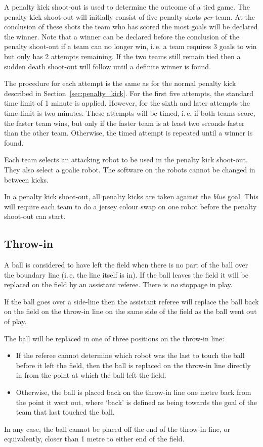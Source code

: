\documentclass[12pt]{article}
\newcommand{\ie}{\mbox{i.\,e.}\xspace}
\begin{document}
A penalty kick shoot-out is used to determine the outcome of a tied
game. The penalty kick shoot-out will initially consist of five
penalty shots \emph{per} team. At the conclusion of these shots the
team who has scored the most goals will be declared the winner. Note
that a winner can be declared before the conclusion of the penalty
shoot-out if a team can no longer win, \ie a team requires 3 goals
to win but only has 2 attempts remaining. If the two teams still
remain tied then a sudden death shoot-out will follow until a
definite winner is found.

The procedure for each attempt is the same as for the normal penalty
kick described in Section~\ref{sec:penalty_kick}. For the first five
attempts, the standard time limit of 1 minute is applied. However,
for the sixth and later attempts the time limit is two minutes.
These attempts will be timed, \ie if both teams score, the faster
team wins, but only if the faster team is at least two seconds
faster than the other team. Otherwise, the timed attempt is repeated
until a winner is found.

Each team selects an attacking robot to be used
in the penalty kick shoot-out. They also select a goalie robot. 
The software on the robots cannot be changed in between kicks.

In a penalty kick shoot-out, all penalty kicks are taken against the
\emph{blue} goal. This will require each team to do a jersey colour
swap on one robot before the penalty shoot-out can start.

\subsection{Throw-in}

A ball is considered to have left the field when there is no part of the ball
over the boundary line  (\ie the line itself is in).
If the ball leaves the field it will be replaced on the field by an
assistant referee. There is \emph{no} stoppage in play.  

If the ball goes over a side-line then the assistant referee will
replace the ball back on the field on the throw-in line on the same
side of the field as the ball went out of play.

The ball will be replaced in one of three positions on the throw-in line:
\begin{itemize}
\item If the referee cannot determine which robot was the last to touch the ball
before it left the field, then the ball is replaced on the throw-in line directly
in from the point at which the ball left the field.
\item Otherwise, the ball is placed back on the throw-in line one metre
back from the point it went out, where `back' is defined as being towards
the goal of the team that last touched the ball.
\end{itemize}
In any case, the ball cannot be placed
off the end of the throw-in line, or equivalently, closer than 1 metre to
either end of the field.
\end{document}

